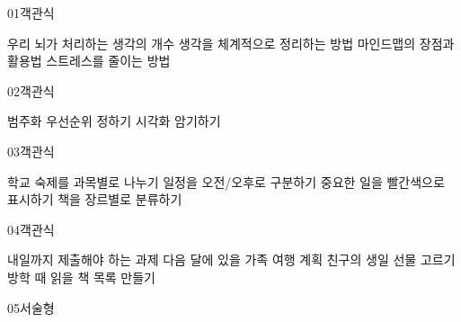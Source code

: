 \documentclass[fs11,seriesFre]{korfarm-base}
\begin{document}
\kfActivityBg \par{}\par\nopagebreak[4]\smallskip\nopagebreak[4]
\begin{kfStructure}
\end{kfStructure}

\kfActivityBg \par{}\par\nopagebreak[4]\smallskip\nopagebreak[4]


\begin{kfQBlock}{01}{객관식}
\begin{kfChoices}
\kfChoice 우리 뇌가 처리하는 생각의 개수
\kfChoice 생각을 체계적으로 정리하는 방법
\kfChoice 마인드맵의 장점과 활용법
\kfChoice 스트레스를 줄이는 방법
\end{kfChoices}
\end{kfQBlock}
\begin{kfQBlock}{02}{객관식}
\begin{kfChoices}
\kfChoice 범주화
\kfChoice 우선순위 정하기
\kfChoice 시각화
\kfChoice 암기하기
\end{kfChoices}
\end{kfQBlock}
\begin{kfQBlock}{03}{객관식}
\begin{kfChoices}
\kfChoice 학교 숙제를 과목별로 나누기
\kfChoice 일정을 오전/오후로 구분하기
\kfChoice 중요한 일을 빨간색으로 표시하기
\kfChoice 책을 장르별로 분류하기
\end{kfChoices}
\end{kfQBlock}
\begin{kfQBlock}{04}{객관식}
\begin{kfChoices}
\kfChoice 내일까지 제출해야 하는 과제
\kfChoice 다음 달에 있을 가족 여행 계획
\kfChoice 친구의 생일 선물 고르기
\kfChoice 방학 때 읽을 책 목록 만들기
\end{kfChoices}
\end{kfQBlock}
\begin{kfQBlock}{05}{서술형}
\end{kfQBlock}
\end{document}
